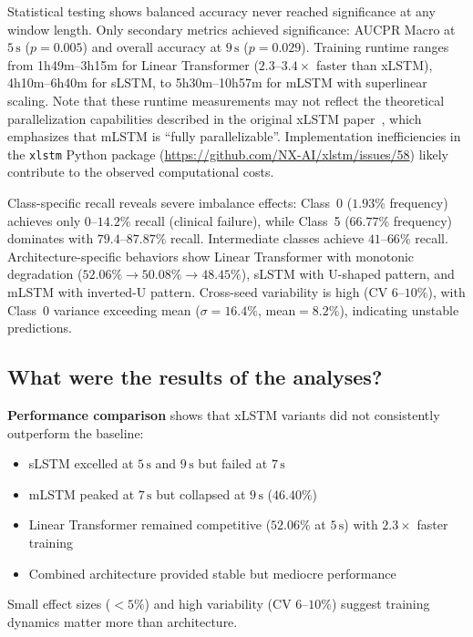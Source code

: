 Statistical testing shows balanced accuracy never reached significance at any window length. Only secondary metrics achieved significance: AUCPR Macro at $5\,\text{s}$ ($p=0.005$) and overall accuracy at $9\,\text{s}$ ($p=0.029$). Training runtime ranges from 1h49m--3h15m for Linear Transformer ($2.3$--$3.4\times$ faster than \ac{xLSTM}), 4h10m--6h40m for \ac{sLSTM}, to 5h30m--10h57m for \ac{mLSTM} with superlinear scaling. Note that these runtime measurements may not reflect the theoretical parallelization capabilities described in the original \ac{xLSTM} paper~\cite{beck2024xlstm}, which emphasizes that \ac{mLSTM} is ``fully parallelizable''. Implementation inefficiencies in the \texttt{xlstm} Python package (\url{https://github.com/NX-AI/xlstm/issues/58}) likely contribute to the observed computational costs.

Class-specific recall reveals severe imbalance effects: Class~0 ($1.93\%$ frequency) achieves only $0$--$14.2\%$ recall (clinical failure), while Class~5 ($66.77\%$ frequency) dominates with $79.4$--$87.87\%$ recall. Intermediate classes achieve $41$--$66\%$ recall. Architecture-specific behaviors show Linear Transformer with monotonic degradation ($52.06\% \rightarrow 50.08\% \rightarrow 48.45\%$), \ac{sLSTM} with U-shaped pattern, and \ac{mLSTM} with inverted-U pattern. Cross-seed variability is high (CV $6$--$10\%$), with Class~0 variance exceeding mean ($\sigma=16.4\%$, mean$=8.2\%$), indicating unstable predictions.

\subsection{What were the results of the analyses?}

\textbf{Performance comparison} shows that \ac{xLSTM} variants did not consistently outperform the baseline:
\begin{itemize}
    \item \ac{sLSTM} excelled at $5\,\text{s}$ and $9\,\text{s}$ but failed at $7\,\text{s}$
    \item \ac{mLSTM} peaked at $7\,\text{s}$ but collapsed at $9\,\text{s}$ ($46.40\%$)
    \item Linear Transformer remained competitive ($52.06\%$ at $5\,\text{s}$) with $2.3\times$ faster training
    \item Combined architecture provided stable but mediocre performance
\end{itemize}
Small effect sizes ($<5\%$) and high variability (CV $6$--$10\%$) suggest training dynamics matter more than architecture.

